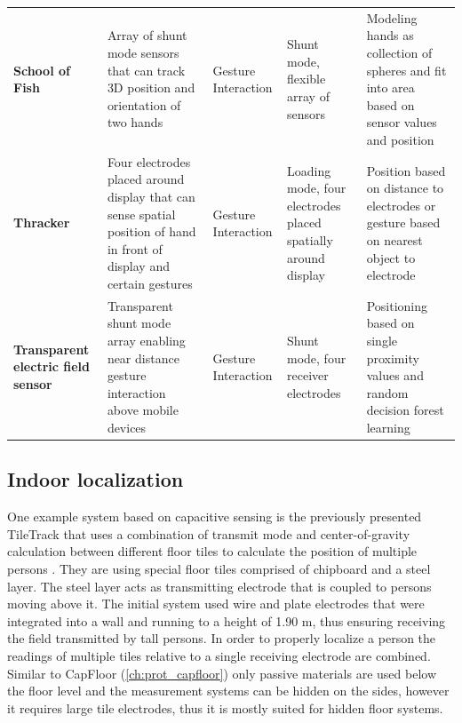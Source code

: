 \begin{table}[htbp]
\begin{tabularx}{\linewidth}{Xp{3.5cm}Xp{3.5cm}p{3.5cm}}
    \textbf{School of Fish \cite{smith1999thesis}} & Array of shunt mode sensors that can track 3D position and orientation of two hands  & Gesture Interaction & Shunt mode, flexible array of sensors & Modeling hands as collection of spheres and fit into area based on sensor values and position \\
    \textbf{Thracker \cite{Wimmer2006}} & Four electrodes placed around display that can sense spatial position of hand in front of display and certain gestures & Gesture Interaction & Loading mode, four electrodes placed spatially around display & Position based on distance to electrodes or gesture based on nearest object to electrode \\
    \textbf{Transparent electric field sensor \cite{le2014low}} & Transparent shunt mode array enabling near distance gesture interaction above mobile devices & Gesture Interaction & Shunt mode, four receiver electrodes & Positioning based on single proximity values and random decision forest learning \\
    \bottomrule
    \end{tabularx}%
  \label{tab:related_cap_proto}%
\end{table}%

\subsection{Indoor localization}
One example system based on capacitive sensing is the previously presented TileTrack that uses a combination of transmit mode and center-of-gravity calculation between different floor tiles to calculate the position of multiple persons \cite{Valtonen2009a}. They are using special floor tiles comprised of chipboard and a steel layer. The steel layer acts as transmitting electrode that is coupled to persons moving above it. The initial system used wire and plate electrodes that were integrated into a wall and running to a height of 1.90 m, thus ensuring receiving the field transmitted by tall persons. In order to properly localize a person the readings of multiple tiles relative to a single receiving electrode are combined. Similar to CapFloor (\ref{ch:prot_capfloor}) only passive materials are used below the floor level and the measurement systems can be hidden on the sides, however it requires large tile electrodes, thus it is mostly suited for hidden floor systems.

